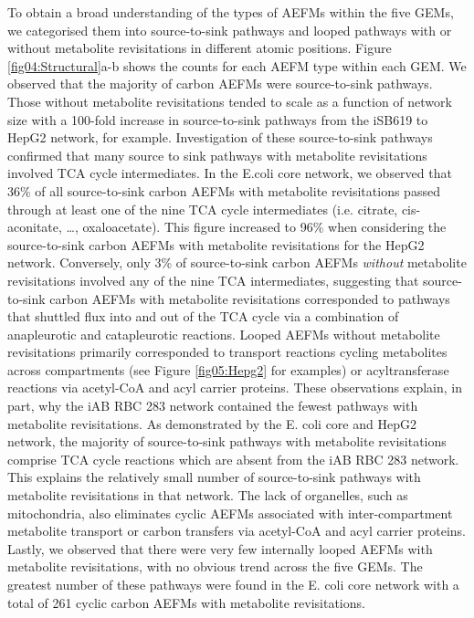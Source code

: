 \documentclass[12pt]{article}
\begin{document}

To obtain a broad understanding of the types of AEFMs within the five
GEMs, we categorised them into source-to-sink pathways and looped pathways
with or without metabolite revisitations in different atomic positions.
Figure \ref{fig04:Structural}a-b shows the counts for each AEFM type
within each GEM. We observed that the majority of carbon AEFMs were
source-to-sink pathways. Those without metabolite revisitations tended to
scale as a function of network size with a 100-fold increase in
source-to-sink pathways from the iSB619 to HepG2 network, for example.
Investigation of these source-to-sink pathways confirmed that many source
to sink pathways with metabolite revisitations involved TCA cycle
intermediates. In the E.coli core network, we observed that 36\% of all
source-to-sink carbon AEFMs with metabolite revisitations passed through
at least one of the nine TCA cycle intermediates (i.e. citrate,
cis-aconitate, \ldots, oxaloacetate). This figure increased to 96\% when
considering the source-to-sink carbon AEFMs with metabolite revisitations
for the HepG2 network. Conversely, only 3\% of source-to-sink carbon AEFMs
\emph{without} metabolite revisitations involved any of the nine TCA
intermediates, suggesting that source-to-sink carbon AEFMs with metabolite
revisitations corresponded to pathways that shuttled flux into and out of
the TCA cycle via a combination of anapleurotic and catapleurotic
reactions. Looped AEFMs without metabolite revisitations primarily
corresponded to transport reactions cycling metabolites across
compartments (see Figure \ref{fig05:Hepg2} for examples) or
acyltransferase reactions via acetyl-CoA and acyl carrier proteins. These
observations explain, in part, why the iAB RBC 283 network contained the
fewest pathways with metabolite revisitations. As demonstrated by the E.
coli core and HepG2 network, the majority of source-to-sink pathways with
metabolite revisitations comprise TCA cycle reactions which are absent
from the iAB RBC 283 network. This explains the relatively small number of
source-to-sink pathways with metabolite revisitations in that network. The
lack of organelles, such as mitochondria, also eliminates cyclic AEFMs
associated with inter-compartment metabolite transport or carbon transfers
via acetyl-CoA and acyl carrier proteins. Lastly, we observed that there
were very few internally looped AEFMs with metabolite revisitations, with
no obvious trend across the five GEMs. The greatest number of these
pathways were found in the E. coli core network with a total of 261 cyclic
carbon AEFMs with metabolite revisitations.
\end{document}
